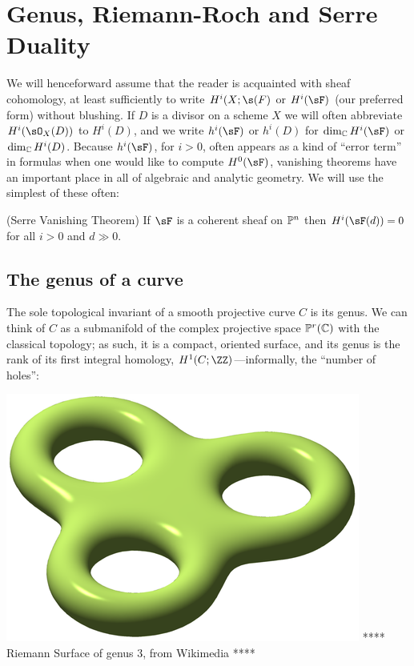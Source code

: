 \section{Genus, Riemann-Roch and Serre Duality}

We will henceforward assume that the reader is acquainted with sheaf cohomology, at least sufficiently to write
$H^i(X; \s(F)$ or  $H^i(\sF)$ (our preferred form) without blushing. If $D$ is a divisor on a scheme $X$ we will often
abbreviate $H^i(\sO_X(D))$ to $H^i(D)$, and we write $h^i(\sF)$ or $h^{i}(D)$ for $\dim_{\CC}H^i(\sF)$ or $\dim_{\CC}H^i(D)$. Because $h^{i}(\sF)$, for $i>0$, often appears as a kind of ``error term'' in formulas when one would like to compute
$H^{0}(\sF)$, vanishing theorems have an important place in all of algebraic and analytic geometry. We will use the simplest of these often:

\begin{theorem}(Serre Vanishing Theorem)\label{Serre vanishing}
If $\sF$ is a coherent sheaf on $\PP^{n}$ then $H^{i}(\sF(d))= 0$ for all $i>0$ and $d\gg 0$.
\end{theorem}

\subsection{The genus of a curve}

The sole topological invariant of a smooth projective curve $C$ is its genus. We can think of $C$ as a submanifold of the complex projective space $\PP^r(\CC)$ with the classical topology; as such, it is a compact, oriented surface, and its genus is the rank of its first integral homology, $H^{1}(C; \ZZ)$---informally, the ``number of holes'':

\includegraphics[scale = 1]{RiemannSurface}
**** Riemann Surface of genus 3, from Wikimedia ****

